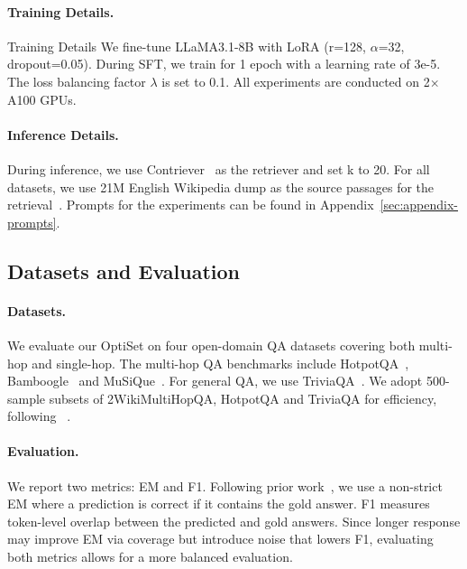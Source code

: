 \documentclass[11pt]{article}
\begin{document}
\paragraph{Training Details.} Training Details We fine-tune LLaMA3.1-8B with LoRA (r=128, $\alpha$=32, dropout=0.05). During SFT, we train for 1 epoch with a learning rate of 3e-5. The loss balancing factor $\lambda$ is set to 0.1. All experiments are
conducted on 2$\times$ A100 GPUs. 

\paragraph{Inference Details.}  During inference, we use Contriever~\citep{izacard2021unsupervised} as the retriever and set k to 20. For all datasets, we use 21M English Wikipedia dump as the source passages for the retrieval~\citep{karpukhin2020dense}. Prompts for the experiments can be found in Appendix~\ref{sec:appendix-prompts}.


\subsection{Datasets and Evaluation}
\paragraph{Datasets. }
We evaluate our OptiSet on four open-domain QA datasets covering both multi-hop and single-hop. The multi-hop QA benchmarks include HotpotQA~\citep{yang2018hotpotqa}, Bamboogle~\citep{press2023measuring} and MuSiQue~\citep{trivedi2022musique}. For general QA, we use TriviaQA~\citep{joshi2017triviaqa}. We adopt 500-sample subsets of 2WikiMultiHopQA, HotpotQA and TriviaQA for efficiency, following ~\citep{trivedi2022interleaving,kim2024sure}. 

\paragraph{Evaluation.} 
We report two metrics: EM and F1. Following prior work~\citet{asai2023self,mallen2022not,jiang2025cocoa}, we use a non-strict EM where a prediction is correct if it contains the gold answer. F1 measures token-level overlap between the predicted and gold answers. Since longer response may improve EM via coverage but introduce noise that lowers F1, evaluating both metrics allows for a more balanced evaluation. 
\end{document}
